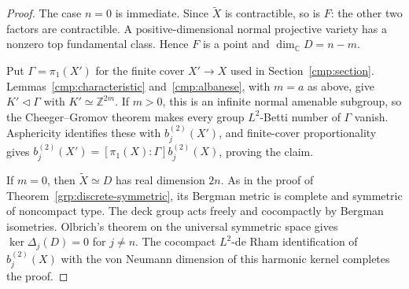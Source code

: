 \documentclass[11pt]{article}
\theoremstyle{definition}
\theoremstyle{remark}
\newcommand{\C}{\mathbb C}
\newcommand{\Z}{\mathbb Z}
\begin{document}
\begin{proof}
The case \(n=0\) is immediate. Since \(\widetilde X\) is contractible,
so is \(F\): the other two factors are contractible. A positive-dimensional
normal projective variety has a nonzero top fundamental class. Hence
\(F\) is a point and \(\dim_{\C}D=n-m\).

Put \(\Gamma=\pi_1(X')\) for the finite cover \(X'\to X\) used in
Section~\ref{cmp:section}. Lemmas~\ref{cmp:characteristic}
and~\ref{cmp:albanese}, with \(m=a\) as above, give
\(K'\lhd\Gamma\) with \(K'\simeq\Z^{2m}\). If \(m>0\), this is an
infinite normal amenable subgroup, so the Cheeger--Gromov theorem
\cite[Theorem~0.3(3) and the proof of Corollary~0.6]{CheegerGromov1986}
makes every group \(L^2\)-Betti number of \(\Gamma\) vanish. Asphericity
identifies these with \(b_j^{(2)}(X')\), and finite-cover proportionality
gives \(b_j^{(2)}(X')=[\pi_1(X):\Gamma]b_j^{(2)}(X)\), proving the claim.

If \(m=0\), then \(\widetilde X\simeq D\) has real dimension \(2n\).
As in the proof of Theorem~\ref{grp:discrete-symmetric}, its Bergman
metric is complete and symmetric of noncompact type. The deck group
acts freely and cocompactly by Bergman isometries. Olbrich's theorem on
the universal symmetric space \cite[Proposition~1.2 and \S4]{Olbrich2002}
gives \(\ker\Delta_j(D)=0\) for \(j\ne n\). The cocompact \(L^2\)-de Rham
identification of \(b_j^{(2)}(X)\) with the von Neumann dimension of this
harmonic kernel completes the proof.
\end{proof}



\begingroup
\small


\endgroup
\end{document}
